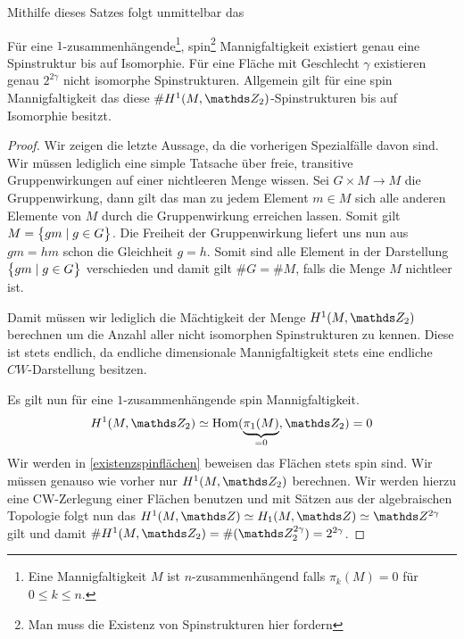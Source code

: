 Mithilfe dieses Satzes folgt unmittelbar das
\begin{Kor}
	Für eine $ 1 $-zusammenhängende\footnote{Eine Mannigfaltigkeit $ M $ ist $ n $-zusammenhängend falls $ \pi_k(M)=0 $ für $ 0\leq k\leq n $.}, spin\footnote{Man muss die Existenz von Spinstrukturen hier fordern} Mannigfaltigkeit existiert genau eine Spinstruktur bis auf Isomorphie. Für eine Fläche mit Geschlecht $ \gamma $ existieren
	genau $ 2^{2\gamma} $ nicht isomorphe Spinstrukturen. Allgemein
	gilt für eine spin Mannigfaltigkeit das diese $ \# H^1(M,\Z_2) $-Spinstrukturen bis auf Isomorphie besitzt.
	\begin{proof}
		Wir zeigen die letzte Aussage, da die vorherigen Spezialfälle
		davon sind. Wir müssen lediglich eine simple Tatsache über
		freie, transitive Gruppenwirkungen auf einer nichtleeren Menge wissen. Sei $ G\times M \longrightarrow M $ die Gruppenwirkung,
		dann gilt das man zu jedem Element $ m\in M $ sich alle
		anderen Elemente von $ M $ durch die Gruppenwirkung erreichen lassen. Somit gilt $ M = \bigl\{ gm \; | \; g\in G \bigr\} $. Die Freiheit
		der Gruppenwirkung liefert uns nun aus $ gm=hm $ schon die 
		Gleichheit $ g=h $. Somit sind alle Element in der Darstellung
		$ \bigl\{ gm \; | \; g\in G \bigr\} $ verschieden und damit gilt $ \# G = \# M $,
		falls die Menge $ M $ nichtleer ist.
		
		Damit müssen wir lediglich die Mächtigkeit der Menge $ H^1(M,\Z_2) $
		berechnen um die Anzahl aller nicht isomorphen Spinstrukturen zu kennen. Diese ist stets endlich, da endliche dimensionale Mannigfaltigkeit stets eine endliche $ CW $-Darstellung besitzen.
		
		Es gilt nun für eine $ 1 $-zusammenhängende spin Mannigfaltigkeit.
		\begin{gather*}
			H^1(M,\Z_2)\simeq \Hom(\underbrace{\pi_1(M)}_{=0},\Z_2)=0 
		\end{gather*}
		Wir werden in \cref{existenzspinflächen} beweisen das Flächen
		stets spin sind. Wir müssen genauso wie vorher nur $ H^1(M,\Z_2) $
		berechnen. Wir werden hierzu eine CW-Zerlegung einer Flächen
		benutzen und mit Sätzen aus der algebraischen Topologie folgt nun
		das $ H^1(M,\Z) \simeq H_1(M,\Z)\simeq\Z^{2\gamma} $ gilt und damit 
		$ \# H^1(M,\Z_2) = \# (\Z_2^{2\gamma})  = 2^{2\gamma}$.
		

\end{proof}
\end{Kor}
